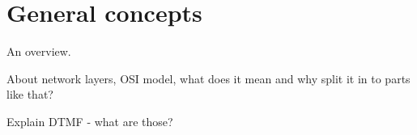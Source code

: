 \chapter{General concepts}
An overview.

About network layers, OSI model, what does it mean and why split it in to parts like that?

Explain DTMF - what are those?